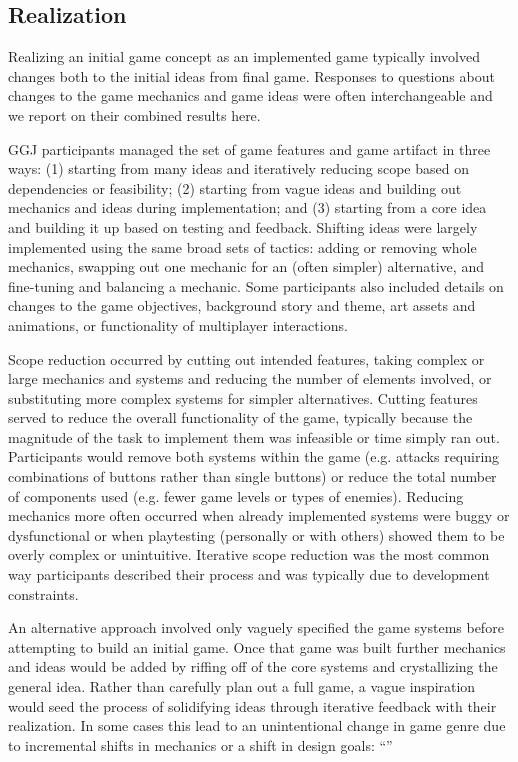 \documentclass{sig-alternate}
\begin{document}
\subsection{Realization}
Realizing an initial game concept as an implemented game typically involved changes both to the initial ideas from final game. Responses to questions about changes to the game mechanics and game ideas were often interchangeable and we report on their combined results here.

GGJ participants managed the set of game features and game artifact in three ways:
(1) starting from many ideas and iteratively reducing scope based on dependencies or feasibility;
(2) starting from vague ideas and building out mechanics and ideas during implementation;
and
(3) starting from a core idea and building it up based on testing and feedback.
Shifting ideas were largely implemented using the same broad sets of tactics: adding or removing whole mechanics, swapping out one mechanic for an (often simpler) alternative, and fine-tuning and balancing a mechanic. Some participants also included details on changes to the game objectives, background story and theme, art assets and animations, or functionality of multiplayer interactions.

Scope reduction occurred by cutting out intended features, taking complex or large mechanics and systems and reducing the number of elements involved, or substituting more complex systems for simpler alternatives.
Cutting features served to reduce the overall functionality of the game, typically because the magnitude of the task to implement them was infeasible or time simply ran out. Participants would remove both systems within the game (e.g. attacks requiring combinations of buttons rather than single buttons) or reduce the total number of components used (e.g. fewer game levels or types of enemies).
Reducing mechanics more often occurred when already implemented systems were buggy or dysfunctional or when playtesting (personally or with others) showed them to be overly complex or unintuitive. 
Iterative scope reduction was the most common way participants described their process and was typically due to development constraints.

An alternative approach involved only vaguely specified the game systems before attempting to build an initial game. Once that game was built further mechanics and ideas would be added by riffing off of the core systems and crystallizing the general idea.
Rather than carefully plan out a full game, a vague inspiration would seed the process of solidifying ideas through iterative feedback with their realization.
In some cases this lead to an unintentional change in game genre due to incremental shifts in mechanics or a shift in design goals:
``''
\end{document}
